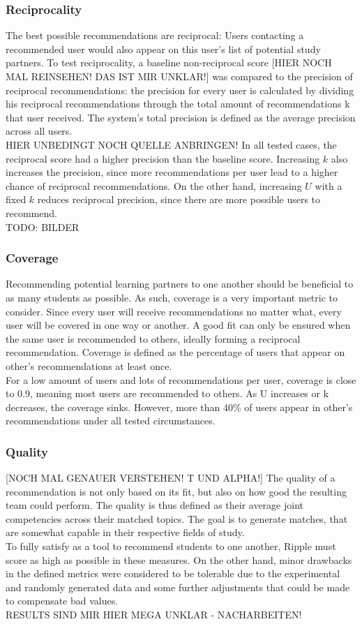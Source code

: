 \documentclass[nochapterpage,bigchapter,linedtoc,longdoc,colorback,accentcolor=tud3b]{tudreport}
\begin{document}
\subsubsection{Reciprocality} The best possible recommendations are reciprocal: Users contacting a recommended user would also appear on this user's list of potential study partners. To test reciprocality, a baseline non-reciprocal score [HIER NOCH MAL REINSEHEN! DAS IST MIR UNKLAR!] was compared to the precision of reciprocal recommendations: the precision for every user is calculated by dividing his reciprocal recommendations through the total amount of recommendations k that user received. The system's total precision is defined as the average precision across all users.\\ HIER UNBEDINGT NOCH QUELLE ANBRINGEN!
In all tested cases, the reciprocal score had a higher precision than the baseline score. Increasing \(k\) also increases the precision, since more recommendations per user lead to a higher chance of reciprocal recommendations. On the other hand, increasing \(U\) with a fixed \(k\) reduces reciprocal precision, since there are more possible users to recommend.\\
TODO: BILDER
\subsubsection{Coverage} Recommending potential learning partners to one another should be beneficial to as many students as possible. As such, coverage is a very important metric to consider. Since every user will receive recommendations no matter what, every user will be covered in one way or another. A good fit can only be ensured when the same user is recommended to others, ideally forming a reciprocal recommendation. Coverage is defined as the percentage of users that appear on other's recommendations at least once.\\
For a low amount of users and lots of recommendations per user, coverage is close to 0.9, meaning most users are recommended to others. As U increases or k decreases, the coverage sinks. However, more than 40\% of users appear in other's recommendations under all tested circumstances.\\
\subsubsection{Quality} [NOCH MAL GENAUER VERSTEHEN! T UND ALPHA!] The quality of a recommendation is not only based on its fit, but also on how good the resulting team could perform. The quality is thus defined as their average joint competencies across their matched topics. The goal is to generate matches, that are somewhat capable in their respective fields of study.\\
To fully satisfy as a tool to recommend students to one another, Ripple must score as high as possible in these measures. On the other hand, minor drawbacks in the defined metrics were considered to be tolerable due to the experimental and randomly generated data and some further adjustments that could be made to compensate bad values.\\
RESULTS SIND MIR HIER MEGA UNKLAR - NACHARBEITEN!
\end{document}
